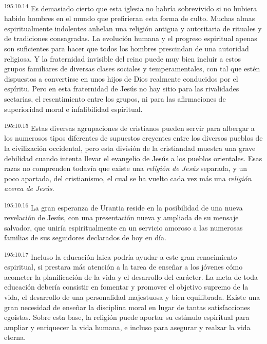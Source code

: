 \par 
\textsuperscript{195:10.14} Es demasiado cierto que esta iglesia no habría sobrevivido si no hubiera habido hombres en el mundo que prefirieran esta forma de culto. Muchas almas espiritualmente indolentes anhelan una religión antigua y autoritaria de rituales y de tradiciones consagradas. La evolución humana y el progreso espiritual apenas son suficientes para hacer que todos los hombres prescindan de una autoridad religiosa. Y la fraternidad invisible del reino puede muy bien incluir a estos grupos familiares de diversas clases sociales y temperamentales, con tal que estén dispuestos a convertirse en unos hijos de Dios realmente conducidos por el espíritu. Pero en esta fraternidad de Jesús no hay sitio para las rivalidades sectarias, el resentimiento entre los grupos, ni para las afirmaciones de superioridad moral e infalibilidad espiritual.

\par 
\textsuperscript{195:10.15} Estas diversas agrupaciones de cristianos pueden servir para albergar a los numerosos tipos diferentes de supuestos creyentes entre los diversos pueblos de la civilización occidental, pero esta división de la cristiandad muestra una grave debilidad cuando intenta llevar el evangelio de Jesús a los pueblos orientales. Esas razas no comprenden todavía que existe una \textit{religión de Jesús} separada, y un poco apartada, del cristianismo, el cual se ha vuelto cada vez más una \textit{religión acerca de Jesús}.

\par 
\textsuperscript{195:10.16} La gran esperanza de Urantia reside en la posibilidad de una nueva revelación de Jesús, con una presentación nueva y ampliada de su mensaje salvador, que uniría espiritualmente en un servicio amoroso a las numerosas familias de sus seguidores declarados de hoy en día.

\par 
\textsuperscript{195:10.17} Incluso la educación laica podría ayudar a este gran renacimiento espiritual, si prestara más atención a la tarea de enseñar a los jóvenes cómo acometer la planificación de la vida y el desarrollo del carácter. La meta de toda educación debería consistir en fomentar y promover el objetivo supremo de la vida, el desarrollo de una personalidad majestuosa y bien equilibrada. Existe una gran necesidad de enseñar la disciplina moral en lugar de tantas satisfacciones egoístas. Sobre esta base, la religión puede aportar su estímulo espiritual para ampliar y enriquecer la vida humana, e incluso para asegurar y realzar la vida eterna.

